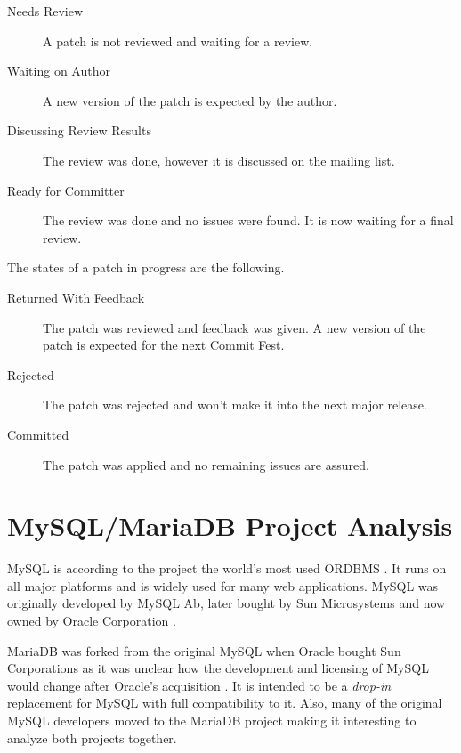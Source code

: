 \begin{description}

  \item[Needs Review] A patch is not reviewed and waiting for a review.

  \item[Waiting on Author] A new version of the patch is expected by the
    author.

  \item[Discussing Review Results] The review was done, however it is
    discussed on the mailing list.

  \item[Ready for Committer] The review was done and no issues were
    found. It is now waiting for a final review.

\end{description}

\noindent The states of a patch in progress are the following.

\begin{description}

  \item[Returned With Feedback] The patch was reviewed and feedback was
    given. A new version of the patch is expected for the next Commit Fest.

  \item[Rejected] The patch was rejected and won't make it into the next
    major release.

  \item[Committed] The patch was applied and no remaining issues are
    assured.

\end{description}


\section{MySQL/MariaDB Project Analysis} %


MySQL is according to the project the world's most used \ac{ORDBMS}
\cite{MySQLSun}. It runs on all major platforms and is widely used for many web
applications. MySQL was originally developed by MySQL Ab, later bought by Sun
Microsystems and now owned by Oracle Corporation
\cite{MySQLSun,MySQLOracle,MySQLHistory}.

MariaDB was forked from the original MySQL when Oracle bought Sun Corporations
as it was unclear how the development and licensing of MySQL would change after
Oracle's acquisition \cite{MySQLAbout,MySQLBehind}. It is intended to be a
\emph{drop-in} replacement for MySQL with full compatibility to it. Also, many
of the original MySQL developers moved to the MariaDB project making it
interesting to analyze both projects together.

